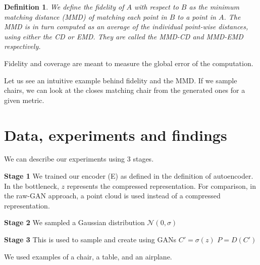 \documentclass[12pt]{article}
\newtheorem{definition}{Definition}
\newcommand{\contentdescription}[1]{}
\begin{document}
    \begin{definition}
        We define the \emph{fidelity} of $A$ with respect to $B$ as the \emph{minimum matching distance} (MMD) of matching each point in $B$ to a point in $A$.
        The MMD is in turn computed as an average of the individual point-wise distances, using either the CD or EMD.
        They are called the MMD-CD and MMD-EMD respectively.
    \end{definition}

    Fidelity and coverage are meant to measure the global error of the computation.

    Let us see an intuitive example behind fidelity and the MMD.
    If we sample chairs, we can look at the closes matching chair from the generated ones for a given metric.


    \section{Data, experiments and findings}
    \contentdescription{
        Data, experiments and findings (30-40\%):

        Describe the data you are working with for your project.
        What type of data is it?
        Where did it come from?
        How much data are you working with?
        Did you have to do any preprocessing, filtering, or other special treatment to use this data in your project?
        Describe and present the experiments that you performed and what is the reason for those experiments.
        Where applicable define evaluation metrics that you used. Discuss the results that you got.
    }

    We can describe our experiments using 3 stages.

    \textbf{Stage 1}
    We trained our encoder (E) as defined in the definition of autoencoder.
    In the bottleneck, $z$ represents the compressed representation.
    For comparison, in the raw-GAN approach, a point cloud is used instead of a compressed representation.

    \textbf{Stage 2}
    We sampled a Gaussian distribution $\mathcal{N}(0,\sigma)$

    \textbf{Stage 3}
    This is used to sample and create using GANs
    $C' = \sigma(z)$
    $P = D(C')$

    We used examples of a chair, a table, and an airplane.
\end{document}
